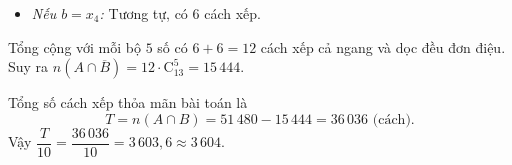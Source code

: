 \begin{ex}
{\begin{itemize}
\begin{itemize}
				\item \textit{Nếu $b = x_4$:} Tương tự, có $6$ cách xếp.
			\end{itemize}
			Tổng cộng với mỗi bộ $5$ số có $6 + 6 = 12$ cách xếp cả ngang và dọc đều đơn điệu. \\
			Suy ra $n\left(A \cap \overline{B}\right) = 12 \cdot \mathrm{C}_{13}^5 = 15\,444$.
		\end{itemize}
		Tổng số cách xếp thỏa mãn bài toán là
		\[T = n(A \cap B) = 51\,480 - 15\,444 = 36\,036 \text{ (cách)}.\]
		Vậy $\dfrac{T}{10} = \dfrac{36\,036}{10} = 3\,603{,}6 \approx 3\,604$.
	}
\end{ex}

\newpage
{}
\label{B\thedeso}